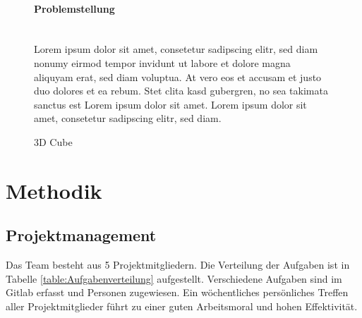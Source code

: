 \documentclass[a4paper]{spie}  %
\begin{document}
\begin{figure}[H]
	\begin{minipage}[t]{0.4\textwidth}
		\vspace{0pt}
		\paragraph{Problemstellung}\mbox{}\\
Lorem ipsum dolor sit amet, consetetur sadipscing elitr, sed diam nonumy eirmod tempor invidunt ut labore et dolore magna aliquyam erat, sed diam voluptua. At vero eos et accusam et justo duo dolores et ea rebum. Stet clita kasd gubergren, no sea takimata sanctus est Lorem ipsum dolor sit amet. Lorem ipsum dolor sit amet, consetetur sadipscing elitr, sed diam.
	\end{minipage}
	\hfill
	\begin{minipage}[t]{0.5\textwidth}
		\vspace{0pt}
		\caption{3D Cube}
		\label{fig:test2}
	\end{minipage}
\end{figure}


\section{Methodik}
\subsection{Projektmanagement}
Das Team besteht aus 5 Projektmitgliedern. Die Verteilung der Aufgaben ist in Tabelle \ref{table:Aufgabenverteilung} aufgestellt.
Verschiedene Aufgaben sind im Gitlab erfasst und Personen zugewiesen. Ein wöchentliches persönliches Treffen aller Projektmitglieder führt zu einer guten Arbeitsmoral und hohen Effektivität.
\end{document}
